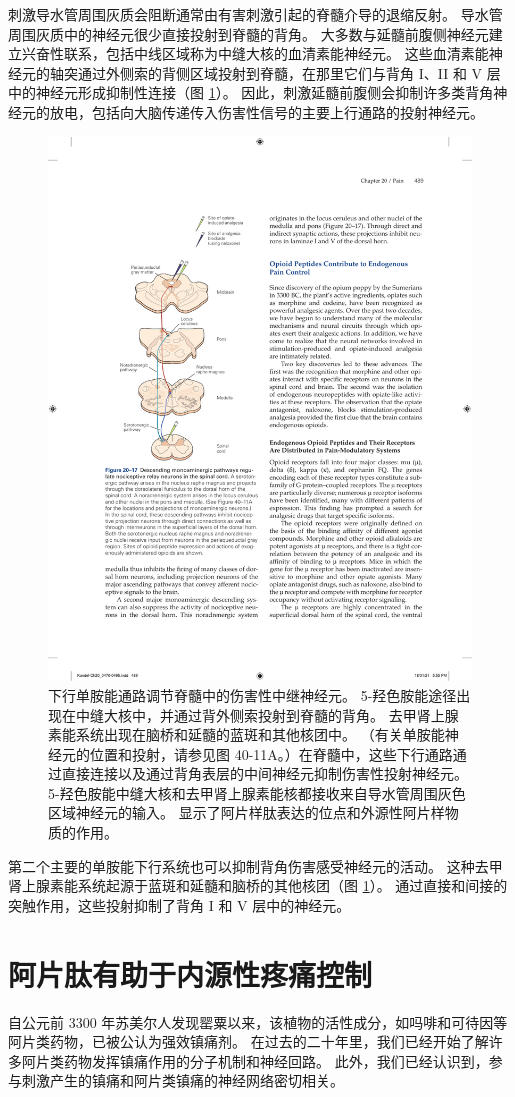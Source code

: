刺激导水管周围灰质会阻断通常由有害刺激引起的脊髓介导的退缩反射。 
导水管周围灰质中的神经元很少直接投射到脊髓的背角。 
大多数与延髓前腹侧神经元建立兴奋性联系，包括中线区域称为中缝大核的血清素能神经元。 
这些血清素能神经元的轴突通过外侧索的背侧区域投射到脊髓，在那里它们与背角 I、II 和 V 层中的神经元形成抑制性连接（图 \ref{fig:20_17}）。 
因此，刺激延髓前腹侧会抑制许多类背角神经元的放电，包括向大脑传递传入伤害性信号的主要上行通路的投射神经元。

\begin{figure}[htbp]
	\centering
	\includegraphics[width=0.7\linewidth]{chap20/fig_20_17}
	\caption{下行单胺能通路调节脊髓中的伤害性中继神经元。 
		5-羟色胺能途径出现在中缝大核中，并通过背外侧索投射到脊髓的背角。 
		去甲肾上腺素能系统出现在脑桥和延髓的蓝斑和其他核团中。 （有关单胺能神经元的位置和投射，请参见图 40-11A。）在脊髓中，这些下行通路通过直接连接以及通过背角表层的中间神经元抑制伤害性投射神经元。 
		5-羟色胺能中缝大核和去甲肾上腺素能核都接收来自导水管周围灰色区域神经元的输入。 
		显示了阿片样肽表达的位点和外源性阿片样物质的作用。}
	\label{fig:20_17}
\end{figure}

第二个主要的单胺能下行系统也可以抑制背角伤害感受神经元的活动。 这种去甲肾上腺素能系统起源于蓝斑和延髓和脑桥的其他核团（图 \ref{fig:20_17}）。 
通过直接和间接的突触作用，这些投射抑制了背角 I 和 V 层中的神经元。


\section{阿片肽有助于内源性疼痛控制}
自公元前 3300 年苏美尔人发现罂粟以来，该植物的活性成分，如吗啡和可待因等阿片类药物，已被公认为强效镇痛剂。 
在过去的二十年里，我们已经开始了解许多阿片类药物发挥镇痛作用的分子机制和神经回路。 
此外，我们已经认识到，参与刺激产生的镇痛和阿片类镇痛的神经网络密切相关。


